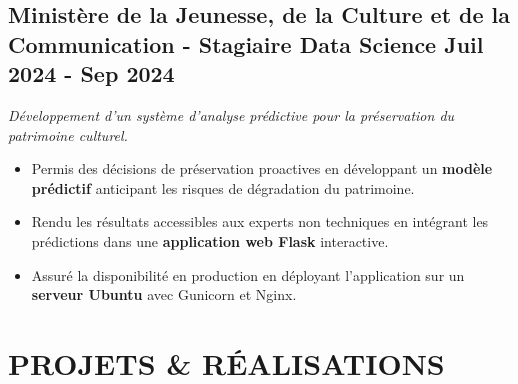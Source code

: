 \documentclass[10pt, letterpaper]{article}
\newenvironment{highlights}{
    \begin{itemize}[
        topsep=0.05cm,
        partopsep=0pt,
        itemsep=0.05cm,
        parsep=0pt,
        leftmargin=0.5cm
    ]
}{
    \end{itemize}
}
\begin{document}
\subsection{Ministère de la Jeunesse, de la Culture et de la Communication - Stagiaire Data Science \hfill Juil 2024 - Sep 2024}
\vspace{-1pt}
\textit{Développement d'un système d'analyse prédictive pour la préservation du patrimoine culturel.}
\begin{highlights}
	\item Permis des décisions de préservation proactives en développant un \textbf{modèle prédictif} anticipant les risques de dégradation du patrimoine.
	\item Rendu les résultats accessibles aux experts non techniques en intégrant les prédictions dans une \textbf{application web Flask} interactive.
	\item Assuré la disponibilité en production en déployant l'application sur un \textbf{serveur Ubuntu} avec Gunicorn et Nginx.
\end{highlights}

\section{PROJETS \& RÉALISATIONS}
\end{document}
